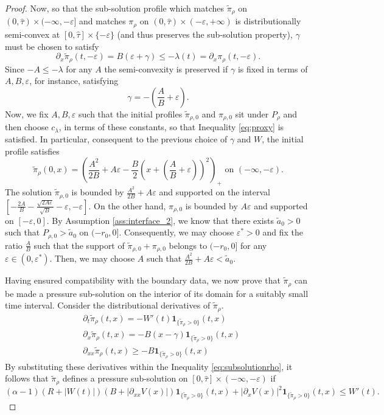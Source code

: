 \documentclass[a4paper,twosided, 11pt]{article}
\newcommand {\e}  {\varepsilon}
\theoremstyle{plain}
\theoremstyle{remark}
\newcommand{\one}{\mathbf{1}}
\numberwithin{equation}{section}
\begin{document}
\begin{proof}
\medskip 

Now, so that the sub-solution profile which matches $\tilde{\pi}_\rho$ on $(0,\hat{\tau}) \times (-\infty, -\e]$ and matches $\pi_\rho$ on $(0,\hat{\tau}) \times (-\e, +\infty) $ is distributionally semi-convex at $[0,\hat{\tau}]\times \{-\e\}$ (and thus preserves the sub-solution property), $\gamma$ must be chosen to satisfy 
\[
\partial_x\tilde{\pi}_\rho(t,-\e) = B(\e+\gamma) \leq -\lambda(t) = \partial_x\pi_\rho (t,-\e).
\]
Since $-A \leq -\lambda$ for any $A$ the semi-convexity is preserved if $\gamma$ is fixed in terms of $A,B, \e$, for instance, satisfying 
\[
\gamma = - \left( \frac{A}{B}+\e\right).
\]
Now, we fix $A,B, \e$ such that the initial profiles $\tilde{\pi}_{\rho,0}$ and ${\pi}_{\rho,0}$
sit under $P_\rho$ and then choose $c_\lambda$, in terms of these constants, so that Inequality \eqref{eq:proxy} is satisfied.
In particular, consequent to the previous choice of $\gamma$ and $W$, the initial profile satisfies 
\[
\tilde{\pi}_\rho(0,x) = \left(\frac{A^2}{2B}+ A\e - \frac{B}{2}\left(x+ \left(\frac{A}{B}+\e\right)\right)^2\right)_{+} \text{ on } (-\infty,-\e).
\]
The solution $\tilde{\pi}_{\rho,0}$ is bounded by $\frac{A^2}{2B}+A\e$ and supported on the interval $[-\frac{2A}{B}- \frac{\sqrt{2A\e}}{\sqrt{B}}-\e ,-\e]$.
On the other hand, $\pi_{\rho,0}$ is bounded by $A\e $ and supported on $[-\e,0]$.
By Assumption \ref{ass:interface_2}, we know that there exists $\tilde{a}_0 > 0$ such that $P_{\rho,0} > \tilde{a}_0 $ on $(-r_0,0]$. 
Consequently, we may choose $\e^\ast > 0$ and fix the ratio $\frac{A}{B}$ such that the support of $\tilde{\pi}_{\rho,0} + \pi_{\rho,0}$ belongs to $(-r_0,0]$ for any $\e \in (0,\e^\ast)$.
Then, we may choose $A$ such that $\frac{A^2}{2B}+ A\e < \tilde{a}_0$.

\medskip 

Having ensured compatibility with the boundary data, we now prove that $\tilde{\pi}_\rho$ can be made a pressure sub-solution on the interior of its domain for a suitably small time interval. 
Consider the distributional derivatives of $\tilde{\pi}_\rho$. 
\begin{align*}
    & \partial_t\tilde{\pi}_\rho(t,x) = - W'(t)\one_{\{\tilde{\pi}_\rho >0\}}(t,x)\\
    & \partial_x \tilde{\pi}_\rho(t,x) = - B(x-\gamma)\one_{\{\tilde{\pi}_\rho >0\}}(t,x)\\
    & \partial_{xx}\tilde{\pi}_\rho(t,x) \geq -B\one_{\{\tilde{\pi}_\rho >0\}}(t,x)
\end{align*}
By substituting these derivatives within the Inequality \eqref{eq:subsolutionrho}, it follows that $\tilde{\pi}_\rho$ defines a pressure sub-solution $\text{on } [0,\hat{\tau}]\times (-\infty,-\e)$ if 
\begin{equation}\label{eq:proxy}
    (\alpha-1)(R+|W(t)|)(B + |\partial_{xx}V(x)|)\one_{\{\tilde{\pi}_\rho >0\}}(t,x) + |\partial_x V(x)|^2\one_{\{\tilde{\pi}_\rho >0\}}(t,x) \leq W'(t). 
\end{equation}


\end{proof}
\end{document}
